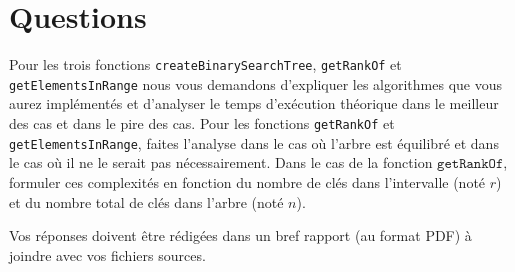 \documentclass[a4paper,10pt]{article}
\begin{document}
\section{Questions}

Pour les trois fonctions \texttt{createBinarySearchTree},
\texttt{getRankOf} et \texttt{getElementsInRange} nous vous demandons
d'expliquer les algorithmes que vous aurez implémentés et d'analyser
le temps d'exécution théorique dans le meilleur des cas et dans le
pire des cas. Pour les fonctions \texttt{getRankOf} et
\texttt{getElementsInRange}, faites l'analyse dans le cas où l'arbre
est équilibré et dans le cas où il ne le serait pas
nécessairement. Dans le cas de la fonction $\texttt{getRankOf}$,
formuler ces complexités en fonction du nombre de clés dans
l'intervalle (noté $r$) et du nombre total de clés dans l'arbre (noté
$n$).

Vos réponses doivent être rédigées dans un bref rapport (au format
PDF) à joindre avec vos fichiers sources.
\end{document}
